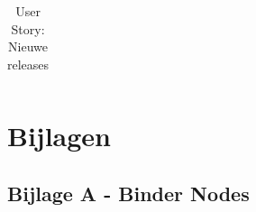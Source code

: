 \documentclass[a4paper]{report}
\begin{document}
\begin{tcolorbox}
\begin{table}[H]
\begin{tabularx}{1\textwidth}{|X|X|}
  \end{tabularx}
  \caption{User Story: Nieuwe releases}
\label{table:it5:new_releases}
\end{table}
\end{tcolorbox}


\chapter{Bijlagen}
\section{Bijlage A - Binder Nodes}
\label{bijlage:bindernodes}
\begin{minipage}{\textwidth}
  \centering
\end{minipage}
\clearpage
\end{document}
